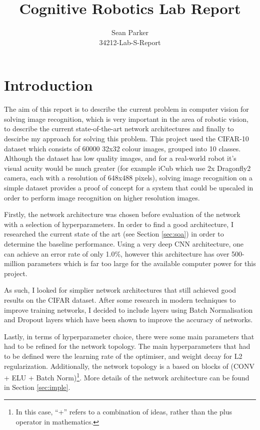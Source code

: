 \documentclass[12pt]{article}
\title{Cognitive Robotics Lab Report}
\author{Sean Parker\\
34212-Lab-S-Report}
\begin{document}
\maketitle

\section{Introduction}
The aim of this report is to describe the current problem in computer vision for solving image recognition, which is very important in the area of robotic vision, to describe the current state-of-the-art network architectures and finally to descirbe my approach for solving this problem. This project used the CIFAR-10 dataset which consists of 60000 32x32 colour images, grouped into 10 classes. Although the dataset has low quality images, and for a real-world robot it's visual acuity would be much greater (for example iCub which use 2x Dragonfly2 camera, each with a resolution of 648x488 pixels), solving image recognition on a simple dataset provides a proof of concept for a system that could be upscaled in order to perform image recognition on higher resolution images.

Firstly, the network architecture was chosen before evaluation of the network with a selection of hyperparameters. In order to find a good architecture, I researched the current state of the art (see Section \ref{sec:soa}) in order to determine the baseline performance. Using a very deep CNN architecture, one can achieve an error rate of only 1.0\%\cite{huang2018gpipe}, however this architecture has over 500-million parameters which is far too large for the available computer power for this project.

As such, I looked for simplier network architectures that still achieved good results on the CIFAR dataset. After some research in modern techniques to improve training networks, I decided to include layers using Batch Normalisation and Dropout layers which have been shown to improve the accuracy of networks\cite{dropout, batch-norm}.

Lastly, in terms of hyperparameter choice, there were some main parameters that had to be refined for the network topology. The main hyperparameters that had to be defined were the learning rate of the optimiser, and weight decay for L2 regularization. Additionally, the network topology is a based on blocks of (CONV + ELU + Batch Norm)\footnote{In this case, ``+'' refers to a combination of ideas, rather than the plus operator in mathematics.}. More details of the network architecture can be found in Section \ref{sec:imple}.
\end{document}
